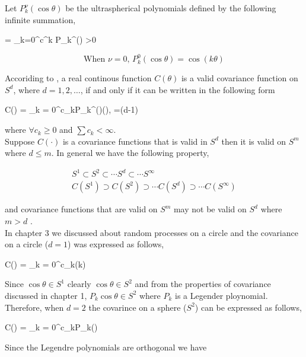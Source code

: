 Let $P_{k}^{\nu}(\cos\theta)$ be the ultraspherical polynomials defined by the following infinite summation,

\beq
   = \sum_{k=0}^{\infty}c^{k} P_{k}^{\nu}(\cos\theta) \quad \nu>0
\eeq


\[
\mbox{When $\nu = 0$, } P_{k}^{0}(\cos\theta) = \cos (k\theta)
\]

Accoriding to \cite{schoenberg1942}, a real continous function $C(\theta)$ is a valid covariance function on $S^d$, where $d=1,2,\ldots$, if and only if it can be written in the following form

\beq
C(\theta) = \sum_{k = 0}^\infty c_kP_k^{(\nu)}(\cos\theta), \quad \nu=(d-1)
\eeq

where $\forall c_k\ge 0$ and $\sum c_k < \infty$. \\

Suppose $C(\cdot)$ is a covariance functions that is valid in $S^d$ then it is valid on $S^m$ where $d\le m$. In general we have the following property,

\begin{eqnarray*}
S^1 \subset S^2 \subset \cdots S^{d} \subset \cdots S^{\infty} \\
C(S^1) \supset C(S^2) \supset \cdots C(S^d) \supset \cdots C(S^{\infty})
\end{eqnarray*}

and covariance functions that are valid on $S^m$ may not be valid on $S^d$ where $m>d$ .\\

In chapter 3 we discussed about random processes on a circle and the covariance on a circle ($d=1$) was expressed as follows,

\beq
C(\theta) = \sum_{k = 0}^\infty c_k\cos (k\theta)
\eeq

Since $\cos\theta \in S^1$ clearly $\cos\theta \in S^2$ and from the properties of covariance discussed in chapter 1, $P_k\cos\theta \in S^2$ where $P_k$ is a Legender ploynomial. Therefore, when $d=2$ the covarince on a sphere ($S^2$) can be expressed as follows,

\beq \label{covs2_sum}
C(\theta) = \sum_{k = 0}^\infty c_kP_k(\cos\theta)
\eeq


Since the Legendre polynomials are orthogonal we have

